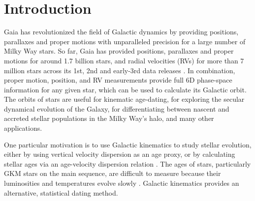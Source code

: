 \documentclass[]{aastex631}
\newcommand{\eg}{{\it e.g.}}
\begin{document}

\section{Introduction}

Gaia has revolutionized the field of Galactic dynamics by providing positions,
parallaxes and proper motions with unparalleled precision for a large number
of Milky Way stars.
So far, Gaia has provided positions, parallaxes and proper motions for around
1.7 billion stars, and radial velocities (RVs) for more than 7 million stars
across its 1st, 2nd and early-3rd data releases \citep{gaia, gaia_dr2,
gaia_edr3}.
In combination, proper motion, position, and RV measurements provide full 6D
phase-space information for any given star, which can be used to calculate its
Galactic orbit.
The orbits of stars are useful for kinematic age-dating, for exploring the
secular dynamical evolution of the Galaxy, for differentiating between nascent
and accreted stellar populations in the Milky Way's halo, and many other
applications.

One particular motivation
is to use Galactic kinematics to study stellar evolution, either by using
vertical velocity dispersion as an age proxy, or by calculating stellar ages
via an age-velocity dispersion relation \citep[\eg][]{angus2020, lu2021}.
The ages of stars, particularly GKM stars on the main sequence, are difficult
to measure because their luminosities and temperatures evolve slowly
\citep[see][for a review of stellar ages]{soderblom2010}.
Galactic kinematics provides an alternative, statistical dating method.
\end{document}
